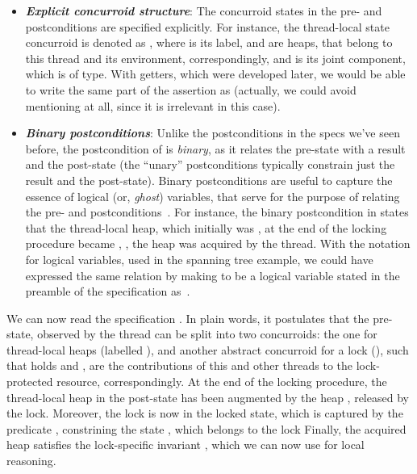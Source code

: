 \begin{itemize}

\item \emph{\textbf{Explicit concurroid structure}}: The concurroid
  states in the pre- and postconditions are specified explicitly. For
  instance, the thread-local state concurroid is denoted as , where  is its label,  and
   are heaps, that belong to this thread and its environment,
  correspondingly, and  is its joint component, which is of
   type. With getters, which were developed later, we would
  be able to write the same part of the assertion as  (actually, we could avoid mentioning
   at all, since it is irrelevant in this case).


\item \emph{\textbf{Binary postconditions}}: Unlike the postconditions
  in the specs we've seen before, the postcondition of 
  is \emph{binary}, as it relates the pre-state  with a result
   and the post-state  (the ``unary'' postconditions
  typically constrain just the result and the post-state). Binary
  postconditions are useful to capture the essence of logical (or,
  \emph{ghost}) variables, that serve for the purpose of relating the
  pre- and postconditions~\cite{Nanevski-al:POPL10}. For instance, the
  binary postcondition in  states that the
  thread-local heap, which initially was , at the end of the
  locking procedure became , \ie, the heap  was
  acquired by the thread. With the notation for logical variables,
  used in the spanning tree example, we could have expressed the same
  relation by making  to be a logical variable stated in the
  preamble of the specification as~.
\end{itemize}

We can now read the specification . In plain words, it
postulates that the pre-state, observed by the thread can be split
into two concurroids: the one for thread-local heaps (labelled
), and another abstract concurroid for a lock (),
such that  holds and ,  are
the contributions of this and other threads to the lock-protected
resource, correspondingly. At the end of the locking procedure, the
thread-local heap in the post-state  has been augmented by the
heap , released by the lock. Moreover, the lock is now in the
locked state, which is captured by the predicate , constrining the state , which belongs to the lock
Finally, the acquired heap satisfies the lock-specific invariant
, which we can now use for local reasoning.


